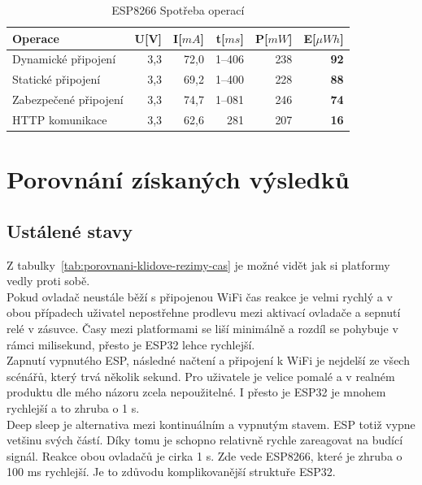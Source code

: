 \documentclass[a4paper, 12pt]{report}
\begin{document}
    \begin{table}[h]
        \centering
        \caption{ESP8266 Spotřeba operací}
        \begin{tabular}{||l| r r r r |r||}
            \hline
            Operace               & U[V] & I[$mA$] & t[$ms$] & P[$mW$] & \textbf{E}[$\mu Wh$] \\
            \hline
            \hline
            Dynamické připojení   & 3,3  & 72,0    & 1--406  & 238     & \textbf{92}          \\
            Statické připojení    & 3,3  & 69,2    & 1--400  & 228     & \textbf{88}          \\
            Zabezpečené připojení & 3,3  & 74,7    & 1--081  & 246     & \textbf{74}          \\
            HTTP komunikace       & 3,3  & 62,6    & 281     & 207     & \textbf{16}          \\
            \hline
        \end{tabular}
        \label{tab:esp32-spotreba-operaci}
    \end{table}


    \section{Porovnání získaných výsledků}

    \subsection{Ustálené stavy}
    Z tabulky~\ref{tab:porovnani-klidove-rezimy-cas} je možné vidět jak si platformy vedly proti sobě. \\
    Pokud ovladač neustále běží s připojenou WiFi čas reakce je velmi rychlý a v obou případech uživatel nepostřehne prodlevu mezi aktivací ovladače a sepnutí relé v zásuvce. Časy mezi platformami se liší minimálně a rozdíl se pohybuje v rámci milisekund, přesto je ESP32 lehce rychlejší. \\
    Zapnutí vypnutého ESP, následné načtení a připojení k WiFi je nejdelší ze všech scénářů, který trvá několik sekund. Pro uživatele je velice pomalé a v realném produktu dle mého názoru zcela nepoužitelné. I přesto je ESP32 je mnohem rychlejší a to zhruba o 1 \si{s}. \\
    Deep sleep je alternativa mezi kontinuálním a vypnutým stavem. ESP totiž vypne vetšinu svých částí. Díky tomu je schopno relativně rychle zareagovat na budící signál. Reakce obou ovladačů je cirka 1 \si{s}. Zde vede ESP8266, které je zhruba o 100 \si{ms} rychlejší. Je to zdůvodu komplikovanější struktuře ESP32.
\end{document}
